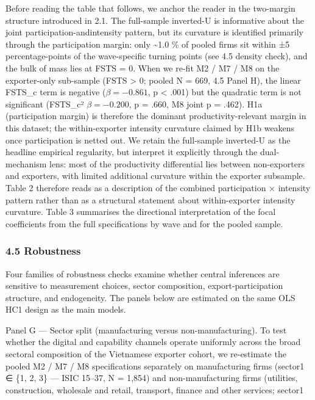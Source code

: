 \documentclass[12pt,a4paper]{article}
\begin{document}
Before reading the table that follows, we anchor the reader in the
two-margin structure introduced in 2.1. The full-sample inverted-U is
informative about the joint participation-andintensity pattern, but its
curvature is identified primarily through the participation margin: only
\textasciitilde1.0 \% of pooled firms sit within ±5 percentage-points of
the wave-specific turning points (see 4.5 density check), and the bulk
of mass lies at FSTS = 0. When we re-fit M2 / M7 / M8 on the
exporter-only sub-sample (FSTS \textgreater{} 0; pooled N = 669, 4.5
Panel H), the linear FSTS\_c term is negative (\(\beta = -0.861\), p
\textless{} .001) but the quadratic term is not significant (FSTS\_c²
\(\beta = -0.200\), p = .660, M8 joint p = .462). H1a (participation
margin) is therefore the dominant productivity-relevant margin in this
dataset; the within-exporter intensity curvature claimed by H1b weakens
once participation is netted out. We retain the full-sample inverted-U
as the headline empirical regularity, but interpret it explicitly
through the dual-mechanism lens: most of the productivity differential
lies between non-exporters and exporters, with limited additional
curvature within the exporter subsample. Table 2 therefore reads as a
description of the combined participation × intensity pattern rather
than as a structural statement about within-exporter intensity
curvature. Table 3 summarises the directional interpretation of the
focal coefficients from the full specifications by wave and for the
pooled sample.

\hypertarget{45-robustness}{%
\subsubsection{4.5 Robustness}\label{45-robustness}}

Four families of robustness checks examine whether central inferences
are sensitive to measurement choices, sector composition,
export-participation structure, and endogeneity. The panels below are
estimated on the same OLS HC1 design as the main models.

Panel G --- Sector split (manufacturing versus non-manufacturing). To
test whether the digital and capability channels operate uniformly
across the broad sectoral composition of the Vietnamese exporter cohort,
we re-estimate the pooled M2 / M7 / M8 specifications separately on
manufacturing firms (sector1 ∈ \{1, 2, 3\} --- ISIC 15--37, N = 1,854)
and non-manufacturing firms (utilities, construction, wholesale and
retail, transport, finance and other services; sector1
\end{document}
